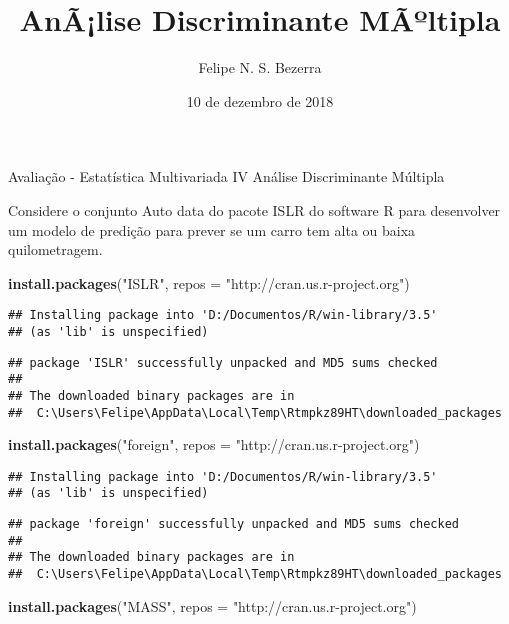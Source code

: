 \documentclass[]{article}
\title{AnÃ¡lise Discriminante MÃºltipla}
\author{Felipe N. S. Bezerra}
\date{10 de dezembro de 2018}
\newenvironment{Shaded}{\begin{snugshade}}{\end{snugshade}}
\newcommand{\KeywordTok}[1]{\textcolor[rgb]{0.13,0.29,0.53}{\textbf{#1}}}
\newcommand{\DataTypeTok}[1]{\textcolor[rgb]{0.13,0.29,0.53}{#1}}
\newcommand{\StringTok}[1]{\textcolor[rgb]{0.31,0.60,0.02}{#1}}
\newcommand{\NormalTok}[1]{#1}
\begin{document}
\maketitle

Avaliação - Estatística Multivariada IV Análise Discriminante Múltipla

Considere o conjunto Auto data do pacote ISLR do software R para
desenvolver um modelo de predição para prever se um carro tem alta ou
baixa quilometragem.

\begin{Shaded}
\begin{Highlighting}[]
\KeywordTok{install.packages}\NormalTok{(}\StringTok{"ISLR"}\NormalTok{, }\DataTypeTok{repos =} \StringTok{"http://cran.us.r-project.org"}\NormalTok{)}
\end{Highlighting}
\end{Shaded}

\begin{verbatim}
## Installing package into 'D:/Documentos/R/win-library/3.5'
## (as 'lib' is unspecified)
\end{verbatim}

\begin{verbatim}
## package 'ISLR' successfully unpacked and MD5 sums checked
## 
## The downloaded binary packages are in
##  C:\Users\Felipe\AppData\Local\Temp\Rtmpkz89HT\downloaded_packages
\end{verbatim}

\begin{Shaded}
\begin{Highlighting}[]
\KeywordTok{install.packages}\NormalTok{(}\StringTok{"foreign"}\NormalTok{, }\DataTypeTok{repos =} \StringTok{"http://cran.us.r-project.org"}\NormalTok{)}
\end{Highlighting}
\end{Shaded}

\begin{verbatim}
## Installing package into 'D:/Documentos/R/win-library/3.5'
## (as 'lib' is unspecified)
\end{verbatim}

\begin{verbatim}
## package 'foreign' successfully unpacked and MD5 sums checked
## 
## The downloaded binary packages are in
##  C:\Users\Felipe\AppData\Local\Temp\Rtmpkz89HT\downloaded_packages
\end{verbatim}

\begin{Shaded}
\begin{Highlighting}[]
\KeywordTok{install.packages}\NormalTok{(}\StringTok{"MASS"}\NormalTok{, }\DataTypeTok{repos =} \StringTok{"http://cran.us.r-project.org"}\NormalTok{)}
\end{Highlighting}
\end{Shaded}
\end{document}
